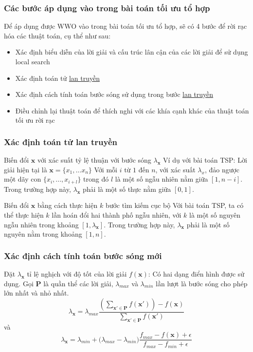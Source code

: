 \begin{frame}
    \frametitle{Các bước áp dụng vào trong bài toán tối ưu tổ hợp}
    Để áp dụng được WWO vào trong bài toán tối ưu tổ hợp, sẽ có 4 bước để rời rạc hóa các thuật toán, cụ thể như sau:
    \begin{itemize}
        \item Xác định biểu diễn của lời giải và cấu trúc lân cận của các lời giải để sử dụng local search
        \item Xác định toán tử \hyperlink{frame:propagation}{lan truyền}
        \item Xác định cách tính toán bước sóng sử dụng trong bước \hyperlink{frame:propagation}{lan truyền}
        \item Điều chỉnh lại thuật toán để thích nghi với các khía cạnh khác của thuật toán tối ưu rời rạc
    \end{itemize}
\end{frame}


\begin{frame}
    \frametitle{Xác định toán tử lan truyền}
    \begin{block}{Biến đổi $\mathbf{x}$ với xác suất tỷ lệ thuận với bước sóng $\lambda_{\mathbf{x}}$}
        Ví dụ với bài toán TSP: Lời giải hiện tại là $\mathbf{x} = \{x_1, ... x_n\}$
Với mỗi $i$ từ $1$ đến $n$, với xác suất $\lambda_{x}$, đảo ngược một dãy con $\{x_i, ..., x_{i + l}\}$ trong đó $l$ là một số ngẫu nhiên nằm giữa $[1, n - i]$. Trong trường hợp này, $\lambda_\mathbf{x}$ phải là một số thực nằm giữa $[0, 1]$.
    \end{block}
    \begin{block}{Biến đổi $\mathbf{x}$ bằng cách thực hiện $k$ bước tìm kiếm cục bộ}
        Với bài toán TSP, ta có thể thực hiện $k$ lần hoán đổi hai thành phố ngẫu nhiên, với $k$ là một số nguyên ngẫu nhiên trong khoảng $[1, \lambda_\mathbf{x}]$. Trong trường hợp này, $\lambda_\mathbf{x}$ phải là một số nguyên nằm trong khoảng $[1, n]$.
    \end{block}
\end{frame}


\begin{frame}
    \frametitle{Xác định cách tính toán bước sóng mới}
    \begin{block}{Đặt $\lambda_{\mathbf{x}}$ tỉ lệ nghịch với độ tốt của lời giải $f(\mathbf{x})$:}
        Có hai dạng điển hình được sử dụng. Gọi $\mathbf{P}$ là quần thể các lời giải, $\lambda_{max}$ và $\lambda_{min}$ lần lượt là bước sóng cho phép lớn nhất và nhỏ nhất.
        \begin{equation}
            \label{eq:e3}
            \lambda_{\mathbf{x}}=\lambda_{max}\frac{(\sum_{\mathbf{x'}\in\mathbf{P}}f(\mathbf{x}'))-f(\mathbf{x})}{\sum_{\mathbf{x'}\in\mathbf{P}}f(\mathbf{x}')}
        \end{equation}
        và
        \begin{equation}
            \label{eq:e4}
            \lambda_{\mathbf{x}} = \lambda_{min} + ({\lambda_{max} - \lambda_{min})\frac{f_{max} - f(\mathbf{x}) + \epsilon}{f_{max} - f_{min} + \epsilon}}
        \end{equation}
    \end{block}
\end{frame}

